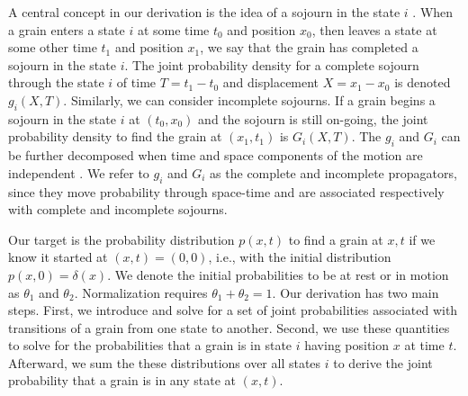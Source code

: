 \documentclass[]{agujournal2018}
\begin{document}
A central concept in our derivation is the idea of a sojourn in the state $i$ \citep{Weiss1994}.
When a grain enters a state $i$ at some time $t_0$ and position $x_0$, then leaves a state at some other time $t_1$ and position $x_1$, we say that the grain has completed a sojourn in the state $i$. The joint probability density for a complete sojourn through the state $i$ of time $T = t_1-t_0$ and displacement $X = x_1-x_0$ is denoted $g_i(X,T).$ Similarly, we can consider incomplete sojourns. If a grain begins a sojourn in the state $i$ at $(t_0,x_0)$ and the sojourn is still on-going, the joint probability density to find the grain at $(x_1,t_1)$ is $G_i(X,T)$. The $g_i$ and $G_i$ can be further decomposed when time and space components of the motion are independent \citep{Weiss1994}.
We refer to $g_i$ and $G_i$ as the complete and incomplete propagators, since they move probability through space-time and are associated respectively with complete and incomplete sojourns.

Our target is the probability distribution $p(x,t)$ to find a grain at $x,t$ if we know it started at $(x,t)=(0,0)$, i.e., with the initial distribution $p(x,0)=\delta(x)$.
We denote the initial probabilities to be at rest or in motion as $\theta_1$ and $\theta_2$. 
Normalization requires $\theta_1+\theta_2=1$.
Our derivation has two main steps.
First, we introduce and solve for a set of joint probabilities associated with transitions of a grain from one state to another.
Second, we use these quantities to solve for the probabilities that a grain is in state $i$ having position $x$ at time $t$.
Afterward, we sum the these distributions over all states $i$ to derive the joint probability that a grain is in any state at $(x,t)$.
\end{document}

